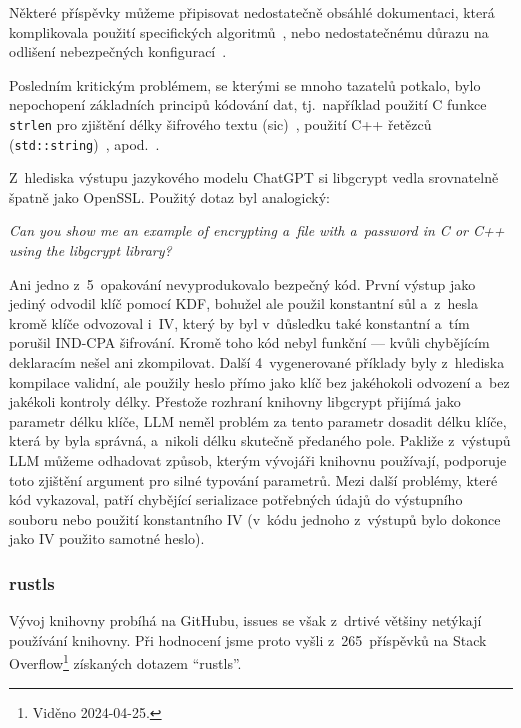 Některé příspěvky můžeme připisovat nedostatečně obsáhlé dokumentaci, která komplikovala použití specifických algoritmů~\cite{so-71102901, so-56509552}, nebo nedostatečnému důrazu na odlišení nebezpečných konfigurací~\cite{so-53749797}.

Posledním kritickým problémem, se kterými se mnoho tazatelů potkalo, bylo nepochopení základních principů kódování dat, tj.\ například použití C funkce \texttt{strlen} pro zjištění délky šifrového textu (sic)~\cite{so-65209512}, použití C++ řetězců (\texttt{std::string})~\cite{so-26189967}, apod.~\cite{so-14174486, so-5852437, so-14196986}.

Z~hlediska výstupu jazykového modelu ChatGPT si libgcrypt vedla srovnatelně špatně jako OpenSSL. Použitý dotaz byl analogický:

\begin{displayquote}
\textit{Can you show me an example of encrypting a~file with a~password in C or C++ using the libgcrypt library?}
\end{displayquote}

Ani jedno z~5~opakování nevyprodukovalo bezpečný kód. První výstup jako jediný odvodil klíč pomocí KDF, bohužel ale použil konstantní sůl a~z~hesla kromě klíče odvozoval i~IV, který by byl v~důsledku také konstantní a~tím porušil IND-CPA šifrování. Kromě toho kód nebyl funkční --- kvůli chybějícím deklaracím nešel ani zkompilovat. Další 4~vygenerované příklady byly z~hlediska kompilace validní, ale použily heslo přímo jako klíč bez jakéhokoli odvození a~bez jakékoli kontroly délky. Přestože rozhraní knihovny libgcrypt přijímá jako parametr délku klíče, LLM neměl problém za tento parametr dosadit délku klíče, která by byla správná, a~nikoli délku skutečně předaného pole. Pakliže z~výstupů LLM můžeme odhadovat způsob, kterým vývojáři knihovnu používají, podporuje toto zjištění argument pro silné typování parametrů. Mezi další problémy, které kód vykazoval, patří chybějící serializace potřebných údajů do výstupního souboru nebo použití konstantního IV (v~kódu jednoho z~výstupů bylo dokonce jako IV použito samotné heslo).

\subsubsection*{rustls}

Vývoj knihovny probíhá na GitHubu, issues se však z~drtivé většiny netýkají používání knihovny. Při hodnocení jsme proto vyšli z~265~příspěvků na Stack Overflow\footnote{Viděno 2024-04-25.} získaných dotazem ``rustls''.

